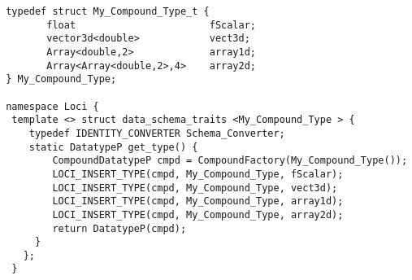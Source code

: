 \begin{verbatim}
 typedef struct My_Compound_Type_t {
        float                       fScalar;      
        vector3d<double>            vect3d;
        Array<double,2>             array1d;
        Array<Array<double,2>,4>    array2d;
 } My_Compound_Type;

 namespace Loci {
  template <> struct data_schema_traits <My_Compound_Type > {
     typedef IDENTITY_CONVERTER Schema_Converter;
     static DatatypeP get_type() {
         CompoundDatatypeP cmpd = CompoundFactory(My_Compound_Type());
         LOCI_INSERT_TYPE(cmpd, My_Compound_Type, fScalar);
         LOCI_INSERT_TYPE(cmpd, My_Compound_Type, vect3d);
         LOCI_INSERT_TYPE(cmpd, My_Compound_Type, array1d);
         LOCI_INSERT_TYPE(cmpd, My_Compound_Type, array2d);
         return DatatypeP(cmpd);
      }
    };
  }
\end{verbatim}
